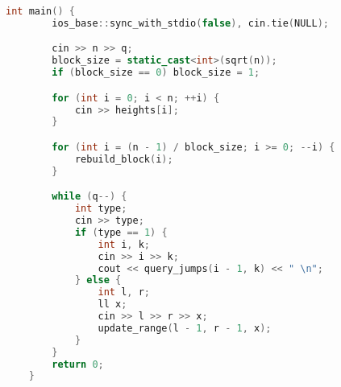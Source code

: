 \documentclass[10pt]{article}
\begin{document}
\begin{itemize}
{\begin{lstlisting}[language=C++, basicstyle=\ttfamily\fontsize{7pt}{8pt}\selectfont]
    int main() {
        ios_base::sync_with_stdio(false), cin.tie(NULL);

        cin >> n >> q;
        block_size = static_cast<int>(sqrt(n));
        if (block_size == 0) block_size = 1;

        for (int i = 0; i < n; ++i) {
            cin >> heights[i];
        }

        for (int i = (n - 1) / block_size; i >= 0; --i) {
            rebuild_block(i);
        }

        while (q--) {
            int type;
            cin >> type;
            if (type == 1) {
                int i, k;
                cin >> i >> k;
                cout << query_jumps(i - 1, k) << " \n";
            } else {
                int l, r;
                ll x;
                cin >> l >> r >> x;
                update_range(l - 1, r - 1, x);
            }
        }
        return 0;
    }
    \end{lstlisting}
}
\end{itemize}
\end{document}
